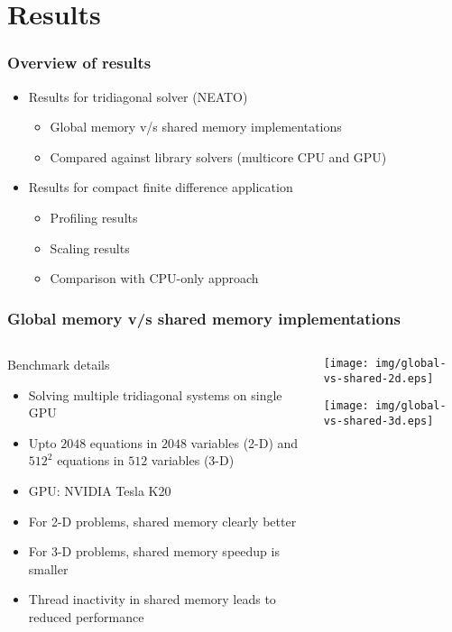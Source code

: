 \section{Results}

\begin{frame}
\frametitle{Overview of results}
\begin{itemize}
\item Results for tridiagonal solver (NEATO)
\begin{itemize}
    \item Global memory v/s shared memory implementations
    \item Compared against library solvers
        (multicore CPU and GPU)
\end{itemize}
\item Results for compact finite difference application
\begin{itemize}
    \item Profiling results
    \item Scaling results
    \item Comparison with CPU-only approach
\end{itemize}
\end{itemize}
\end{frame}

\begin{frame}
\frametitle{Global memory v/s shared memory implementations}
\footnotesize
\begin{columns}
\begin{column}{0.5\textwidth}

\begin{block}{Benchmark details}
\begin{itemize}
\item Solving multiple tridiagonal systems on single GPU
\item Upto $2048$ equations in $2048$ variables (2-D)
    and $512^2$ equations in $512$ variables (3-D)
\item GPU: NVIDIA Tesla K20
\end{itemize}
\end{block}

\begin{itemize}
\item For 2-D problems, shared memory clearly better
\item For 3-D problems, shared memory speedup
    is smaller
\item Thread inactivity in shared memory leads
    to reduced performance
\end{itemize}
\end{column}
\begin{column}{0.5\textwidth}
\centering
\texttt{[image: img/global-vs-shared-2d.eps]}

\texttt{[image: img/global-vs-shared-3d.eps]}
\end{column}
\end{columns}
\end{frame}

